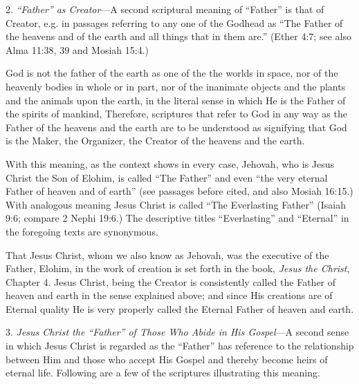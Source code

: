 2. \textit{``Father'' as Creator}—A second scriptural meaning of ``Father'' is that of Creator, e.g. in
passages referring to any one of the Godhead as ``The Father of the heavens and of the earth
and all things that in them are.'' (Ether 4:7; see also Alma 11:38, 39 and Mosiah 15:4.)

God is not the father of the earth as one of the the worlds in space, nor of the heavenly bodies
in whole or in part, nor of the inanimate objects and the plants and the animals upon the
earth, in the literal sense in which He is the Father of the spirits of mankind, Therefore,
scriptures that refer to God in any way as the Father of the heavens and the earth are to be
understood as signifying that God is the Maker, the Organizer, the Creator of the heavens and
the earth.

With this meaning, as the context shows in every case, Jehovah, who is Jesus Christ the Son
of Elohim, is called ``The Father'' and even ``the very eternal Father of heaven and of earth''
(see passages before cited, and also Mosiah 16:15.) With analogous meaning Jesus Christ is
called ``The Everlasting Father'' (Isaiah 9:6; compare 2 Nephi 19:6.) The descriptive titles
``Everlasting'' and ``Eternal'' in the foregoing texts are synonymous.

That Jesus Christ, whom we also know as Jehovah, was the executive of the Father, Elohim,
in the work of creation is set forth in the book, \textit{Jesus the Christ}, Chapter 4. Jesus Christ,
being the Creator is consistently called the Father of heaven and earth in the sense explained
above; and since His creations are of Eternal quality He is very properly called the Eternal
Father of heaven and earth.

3. \textit{Jesus Christ the ``Father'' of Those Who Abide in His Gospel}—A second sense in which
Jesus Christ is regarded as the ``Father'' has reference to the relationship between Him and
those who accept His Gospel and thereby become heirs of eternal life. Following are a few of
the scriptures illustrating this meaning.

